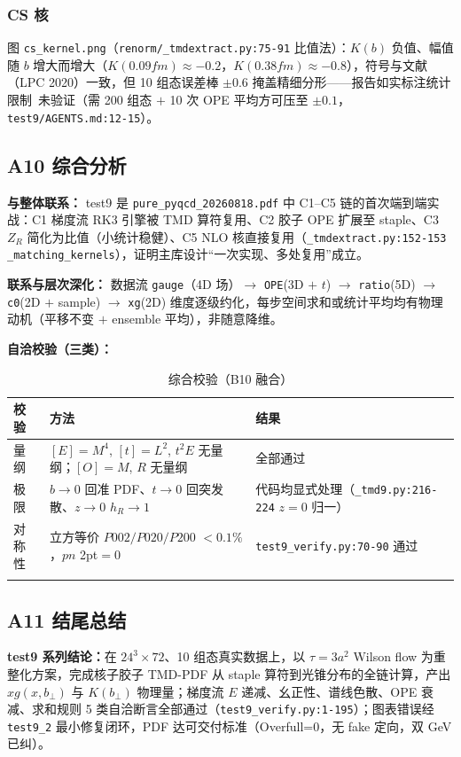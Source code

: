 \documentclass[UTF8]{ctexart}
\begin{document}
\subsubsection{CS 核}
图 \texttt{\nolinkurl{cs\_kernel.png}}（\texttt{\nolinkurl{renorm/\_tmdextract.py:75-91}} 比值法）：$K(b)$ 负值、幅值随 $b$ 增大而增大（$K(0.09fm)\approx-0.2$，$K(0.38fm)\approx-0.8$），符号与文献（LPC 2020）一致，但 10 组态误差棒 $\pm0.6$ 掩盖精细分形——报告如实标注统计限制\ \textcolor{warn}{未验证}（需 200 组态 $+$ 10 次 OPE 平均方可压至 $\pm0.1$，\texttt{\nolinkurl{test9/AGENTS.md:12-15}}）。

\subsection{A10 综合分析}
\label{sec:a10}
\textbf{与整体联系：} test9 是 \texttt{\nolinkurl{pure\_pyqcd\_20260818.pdf}} 中 C1--C5 链的首次端到端实战：C1 梯度流 RK3 引擎被 TMD 算符复用、C2 胶子 OPE 扩展至 staple、C3 $Z_R$ 简化为比值（小统计稳健）、C5 NLO 核直接复用（\texttt{\nolinkurl{\_tmdextract.py:152-153}} \texttt{\nolinkurl{\_matching\_kernels}}），证明主库设计“一次实现、多处复用”成立。

\textbf{联系与层次深化：} 数据流 \texttt{\nolinkurl{gauge}}（4D 场）$\rightarrow$ \texttt{\nolinkurl{OPE}}(3D $+$ $t$) $\rightarrow$ \texttt{\nolinkurl{ratio}}(5D) $\rightarrow$ \texttt{\nolinkurl{c0}}(2D $+$ sample) $\rightarrow$ \texttt{\nolinkurl{xg}}(2D) 维度逐级约化，每步空间求和或统计平均均有物理动机（平移不变 $+$ ensemble 平均），非随意降维。

\textbf{自洽校验（三类）：}
\tiny
\begin{xltabular}{\textwidth}{llX}
\toprule
校验 & 方法 & 结果 \\
\midrule
\endhead
量纲 & $[E]=M^4$, $[t]=L^2$, $t^2E$ 无量纲；$[O]=M$, $R$ 无量纲 & 全部通过 \\
极限 & $b\to0$ 回准 PDF、$t\to0$ 回突发散、$z\to0$ $h_R\to1$ & 代码均显式处理（\texttt{\nolinkurl{\_tmd9.py:216-224}} $z=0$ 归一）\\
对称性 & 立方等价 $P002/P020/P200$ $<0.1\%$，$pn$ 2pt$=0$ & \texttt{\nolinkurl{test9\_verify.py:70-90}} 通过 \\
\bottomrule
\caption{综合校验（B10 融合）}
\end{xltabular}

\subsection{A11 结尾总结}
\begin{conclbox}
\textbf{test9 系列结论：}在 $24^3\times72$、10 组态真实数据上，以 $\tau=3a^2$ Wilson flow 为重整化方案，完成核子胶子 TMD-PDF 从 staple 算符到光锥分布的全链计算，产出 $xg(x,b_\perp)$ 与 $K(b_\perp)$ 物理量；梯度流 $E$ 递减、幺正性、谱线色散、OPE 衰减、求和规则 5 类自洽断言全部通过（\texttt{\nolinkurl{test9\_verify.py:1-195}}）；图表错误经 \texttt{\nolinkurl{test9\_2}} 最小修复闭环，PDF 达可交付标准（Overfull=0，无 fake 定向，双 GeV 已纠）。
\end{conclbox}
\end{document}
